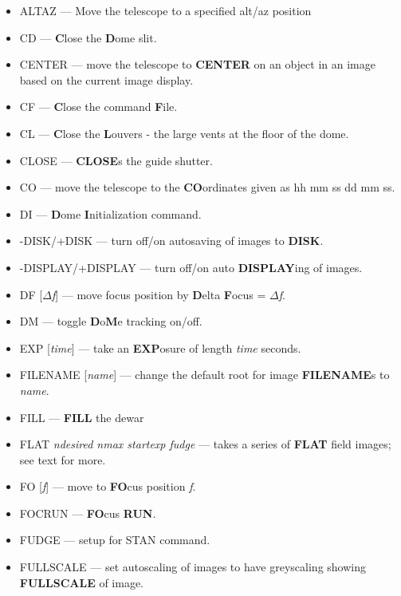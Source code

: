 \begin{itemize}

\item{{ALTAZ} --- Move the telescope to a specified alt/az position}

\item{{CD} --- {\bf C}lose the {\bf D}ome slit.}
\item{{CENTER} --- move the telescope to {\bf CENTER} on an object in an image based on the current image display.}
\item{{CF} --- {\bf C}lose the command {\bf F}ile.}
\item{{CL} --- {\bf C}lose the {\bf L}ouvers - the large vents at the floor of the dome.}
\item{{CLOSE} --- {\bf CLOSE}s the guide shutter.}
\item{{CO} --- move the telescope to the {\bf CO}ordinates given as hh mm ss dd mm ss.}

\item{{DI} --- {\bf D}ome {\bf I}nitialization command.}
\item{{-DISK/+DISK} --- turn off/on autosaving of images to {\bf DISK}.}
\item{{-DISPLAY/+DISPLAY} --- turn off/on auto {\bf DISPLAY}ing of images.}
\item{{DF [{\it $\Delta$f}]} --- move focus position by {\bf D}elta {\bf F}ocus = {\it $\Delta$f}.}
\item{{DM} --- toggle {\bf D}o{\bf M}e tracking on/off.}

\item{{EXP [{\it time}]} --- take an {\bf EXP}osure of length {\it time} seconds.}

\item{{FILENAME [{\it name}]} --- change the default root for image {\bf FILENAME}s to {\it name}.}
\item{{FILL} --- {\bf FILL} the dewar}
\item{{FLAT {\it ndesired nmax startexp fudge}} --- takes a series of {\bf FLAT} field images; see text for more.}
\item{{FO [{\it f}]} --- move to {\bf FO}cus position {\it f}.}
\item{{FOCRUN} --- {\bf FO}cus {\bf RUN}.}
\item {{FUDGE} --- setup for STAN command.}
\item{{FULLSCALE} --- set autoscaling of images to have greyscaling showing {\bf FULLSCALE} of image.}


\end{itemize}
